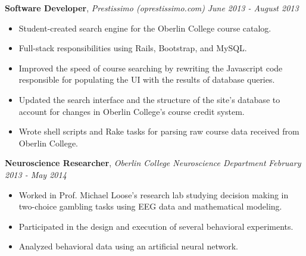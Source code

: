 \documentclass[9pt]{article}
\newenvironment{changemargin}[2]{%
  \begin{list}{}{%
    \setlength{\topsep}{0pt}%
    \setlength{\leftmargin}{#1}%
    \setlength{\rightmargin}{#2}%
    \setlength{\listparindent}{\parindent}%
    \setlength{\itemindent}{\parindent}%
    \setlength{\parsep}{\parskip}%
  }%
  \item[]}{\end{list}
}
\newenvironment{body} {
	\vspace*{-16pt}
	\begin{changemargin}{-0.25in}{-0.5in}
  }	
	{\end{changemargin}
}
\begin{document}
\begin{body}
	\textbf{Software Developer}, \emph{Prestissimo (oprestissimo.com)} \hfill \emph{June 2013 - August 2013}\\
	\vspace*{-4pt}
	\begin{itemize} \itemsep -0pt  %
		\item Student-created search engine for the  Oberlin College course catalog.
		\item Full-stack responsibilities using Rails, Bootstrap, and MySQL.
		\item Improved the speed of course searching by rewriting the Javascript code responsible for populating the UI with the results of database queries.
		\item Updated the search interface and the structure of the site's database to account for changes in Oberlin College's course credit system.
		\item Wrote shell scripts and Rake tasks for parsing raw course data received from Oberlin College.
	\end{itemize}

	\textbf{Neuroscience Researcher}, \emph{Oberlin College Neuroscience Department} \hfill \emph{February 2013 - May 2014}\\
	\vspace*{-4pt}
	\begin{itemize} \itemsep -0pt  %
		\item Worked in Prof. Michael Loose's research lab studying decision making in two-choice gambling tasks using EEG data and mathematical modeling.
		\item Participated in the design and execution of several behavioral experiments.
		\item Analyzed behavioral data using an artificial neural network.
	\end{itemize}
\end{body}
\end{document}
